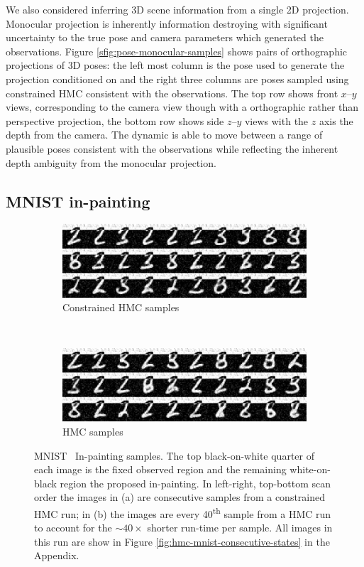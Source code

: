 We also considered inferring 3D scene information from a single 2D projection. Monocular projection is inherently information destroying with significant uncertainty to the true pose and camera parameters which generated the observations. Figure \ref{sfig:pose-monocular-samples} shows pairs of orthographic projections of 3D poses: the left most column is the pose used to generate the projection conditioned on and the right three columns are poses sampled using constrained \ac{HMC} consistent with the observations. The top row shows front $x$--$y$ views, corresponding to the camera view though with a orthographic rather than perspective projection, the bottom row shows side $z$--$y$ views with the $z$ axis the depth from the camera. The dynamic is able to move between a range of plausible poses consistent with the observations while reflecting the inherent depth ambiguity from the monocular projection.

\subsection{MNIST in-painting}

\begin{figure}
\centering
\begin{subfigure}[b]{0.48\textwidth}
  \includegraphics[width=\textwidth]{images/chmc-mnist-samples}
  \caption{Constrained HMC samples}
  \label{sfig:mnist-samples-chmc}
\end{subfigure}
~~
\begin{subfigure}[b]{0.48\textwidth}
  \includegraphics[width=\textwidth]{images/hmc-mnist-samples}
  \caption{HMC samples}
  \label{sfig:mnist-samples-hmc}
\end{subfigure}
\caption[MNIST in-painting samples.]{\textsf{MNIST}~ In-painting samples. The top black-on-white quarter of each image is the fixed observed region and the remaining white-on-black region the proposed in-painting. In left-right, top-bottom scan order the images in (a) are consecutive samples from a constrained \ac{HMC} run; in (b) the images are every 40\textsuperscript{th} sample from a \ac{HMC} run to account for the $\sim 40\times$ shorter run-time per sample. All images in this run are show in Figure \ref{fig:hmc-mnist-consecutive-states} in the Appendix.}
\label{fig:mnist}
\end{figure}

